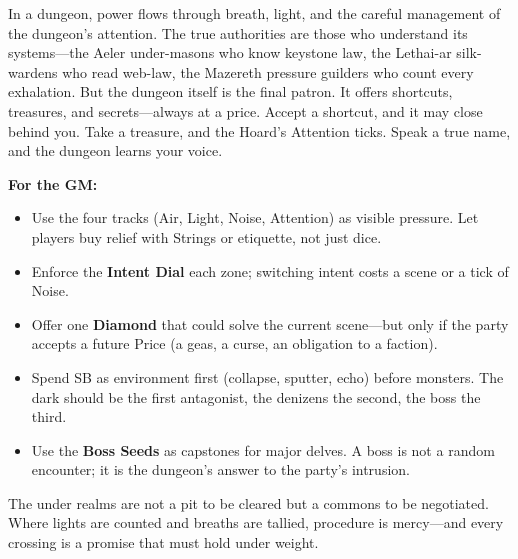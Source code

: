 \begin{tcolorbox}[colback=black!3,colframe=black!40!white,title={Patronage \& Power},breakable]
In a dungeon, power flows through breath, light, and the careful management of the dungeon's attention. The true authorities are those who understand its systems---the Aeler under-masons who know keystone law, the Lethai-ar silk-wardens who read web-law, the Mazereth pressure guilders who count every exhalation. But the dungeon itself is the final patron. It offers shortcuts, treasures, and secrets---always at a price. Accept a shortcut, and it may close behind you. Take a treasure, and the Hoard's Attention ticks. Speak a true name, and the dungeon learns your voice.

\textbf{For the GM:}
\begin{itemize}
    \item Use the four tracks (Air, Light, Noise, Attention) as visible pressure. Let players buy relief with Strings or etiquette, not just dice.
    \item Enforce the \textbf{Intent Dial} each zone; switching intent costs a scene or a tick of Noise.
    \item Offer one \textbf{Diamond} that could solve the current scene---but only if the party accepts a future Price (a geas, a curse, an obligation to a faction).
    \item Spend SB as environment first (collapse, sputter, echo) before monsters. The dark should be the first antagonist, the denizens the second, the boss the third.
    \item Use the \textbf{Boss Seeds} as capstones for major delves. A boss is not a random encounter; it is the dungeon's answer to the party's intrusion.
\end{itemize}
The under realms are not a pit to be cleared but a commons to be negotiated. Where lights are counted and breaths are tallied, procedure is mercy---and every crossing is a promise that must hold under weight.
\end{tcolorbox}

